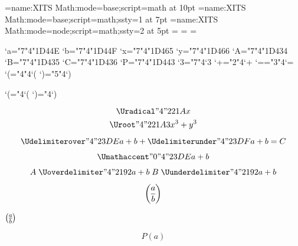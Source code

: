 

\font\4={name:XITS Math:mode=base;script=math} at 10pt
\font\5={name:XITS Math:mode=base;script=math;ssty=1} at 7pt
\font\6={name:XITS Math:mode=node;script=math;ssty=2} at 5pt
=\4 =\5 =\6

\Umathcode`a="7"4"1D44E
\Umathcode`b="7"4"1D44F
\Umathcode`x="7"4"1D465
\Umathcode`y="7"4"1D466
\Umathcode`A="7"4"1D434
\Umathcode`B="7"4"1D435
\Umathcode`C="7"4"1D436
\Umathcode`P="7"4"1D443
\Umathcode`3="7"4`3
\Umathcode`+="2"4`+
\Umathcode`=="3"4`=
\Umathcode`(="4"4`(
\Umathcode`)="5"4`)

\Udelcode`(="4`(
\Udelcode`)="4`)

$$\Uradical "4 "221A {x}$$
$$\Uroot    "4 "221A {3}{x^3+y^3}$$

$$
  \Udelimiterover  "4 "23DE {a+b}
+ \Udelimiterunder "4 "23DF {a+b} = C
$$

$$
  \Umathaccent    "0 "4 "23DE {a+b}
$$

$$
A \mathrel{\Uoverdelimiter  "4 "2192 {a+b}}
B \mathrel{\Uunderdelimiter "4 "2192 {a+b}}
$$

$$
{a \overwithdelims() b}
$$


\centerline{$ a \overwithdelims() b $}

$$
P(a)
$$

\bye
